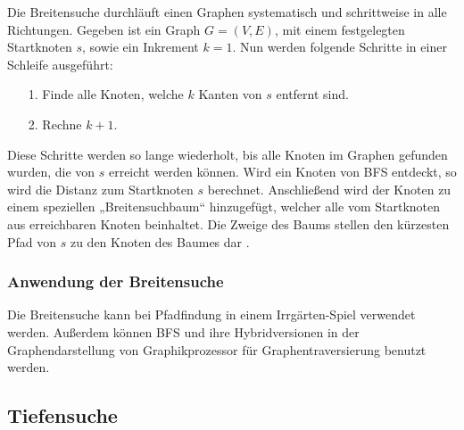Die Breitensuche durchläuft einen Graphen systematisch und schrittweise in alle Richtungen. Gegeben ist ein Graph $G = (V, E)$, mit einem festgelegten Startknoten $s$, sowie ein Inkrement $k=1$. Nun werden folgende Schritte in einer Schleife ausgeführt:
\begin{itemize}
\item[1.] Finde alle Knoten, welche $k$ Kanten von $s$ entfernt sind.
\item[2.] Rechne $k + 1$.
\end{itemize}
Diese Schritte werden so lange wiederholt, bis alle Knoten im Graphen gefunden wurden, die von $s$ erreicht werden können. Wird ein Knoten von BFS entdeckt, so wird die Distanz zum Startknoten $s$ berechnet. Anschließend wird der Knoten zu einem speziellen „Breitensuchbaum“ hinzugefügt, welcher alle vom Startknoten aus erreichbaren Knoten beinhaltet. Die Zweige des Baums stellen den kürzesten Pfad von $s$ zu den Knoten des Baumes dar \cite{Cormen.2009}.

\subsubsection{Anwendung der Breitensuche}
Die Breitensuche kann bei Pfadfindung in einem Irrgärten-Spiel verwendet werden\cite{Permana.2018}. Außerdem können BFS und ihre Hybridversionen\cite{effHyb} in der Graphendarstellung von Graphikprozessor für Graphentraversierung benutzt werden\cite{scaleGPU}. %

\subsection{Tiefensuche}

